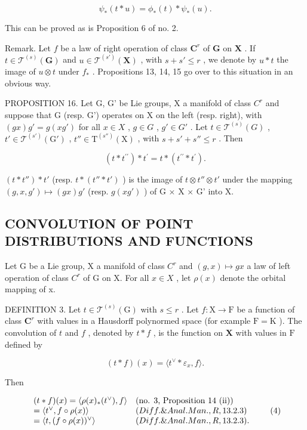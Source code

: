 \[
\psi_ {*} (t * u) = \phi_ {*} (t) * \psi_ {*} (u).
\]

This can be proved as is Proposition 6 of no. 2.

Remark. Let \(f\) be a law of right operation of class \(\mathbf{C}^r\) of \(\mathbf{G}\) on \(\mathbf{X}\) . If \(t \in \mathcal{T}^{(s)}(\mathbf{G})\) and \(u \in \mathcal{T}^{(s')}(\mathbf{X})\) , with \(s + s' \leqslant r\) , we denote by \(u * t\) the image of \(u \otimes t\) under \(f_*\) . Propositions 13, 14, 15 go over to this situation in an obvious way.

PROPOSITION 16. Let G, G' be Lie groups, X a manifold of class \(C^{r}\) and suppose that G (resp. G') operates on X on the left (resp. right), with \((gx)g' = g(xg')\) for all \(x \in X\) , \(g \in G\) , \(g' \in G'\) . Let \(t \in \mathcal{T}^{(s)}(G)\) , \(t' \in \mathcal{T}^{(s')}(\mathrm{G}')\) , \(t'' \in \mathrm{T}^{(s'')}(\mathrm{X})\) , with \(s + s' + s'' \leqslant r\) . Then

\[
(t * t ^ {\prime \prime}) * t ^ {\prime} = t * (t ^ {\prime \prime} * t ^ {\prime}).
\]

\((t*t'')*t'\) (resp. \(t*(t''*t')\) ) is the image of \(t\otimes t''\otimes t'\) under the mapping \((g,x,g')\mapsto(gx)g'\) (resp. \(g(xg')\) ) of G × X × G' into X.

\subsection{CONVOLUTION OF POINT DISTRIBUTIONS AND FUNCTIONS}

Let G be a Lie group, X a manifold of class \(C^{r}\) and \((g, x) \mapsto gx\) a law of left operation of class \(C^{r}\) of G on X. For all \(x \in X\) , let \(\rho(x)\) denote the orbital mapping of x.

DEFINITION 3. Let \(t \in \mathcal{T}^{(s)}(\mathrm{G})\) with \(s \leqslant r\) . Let \(f: \mathrm{X} \to \mathrm{F}\) be a function of class \(\mathbf{C}^r\) with values in a Hausdorff polynormed space (for example \(\mathrm{F} = \mathrm{K}\) ). The convolution of \(t\) and \(f\) , denoted by \(t * f\) , is the function on \(\mathbf{X}\) with values in \(\mathrm{F}\) defined by

\[
(t * f) (x) = \langle t ^ {\vee} * \varepsilon_ {x}, f \rangle .
\]

Then

\[
\begin{array}{l l} (t * f) (x) = \langle \rho (x) _ {*} (t ^ {\vee}), f \rangle & (\text {no. 3, Proposition 14 (ii)}) \\ = \langle t ^ {\vee}, f \circ \rho (x) \rangle & (Diff. \& Anal. Man., R, 13.2.3) \\ = \langle t, (f \circ \rho (x)) ^ {\vee} \rangle & (Diff. \& Anal. Man., R, 13.2.3). \end{array}\tag{4}
\]

